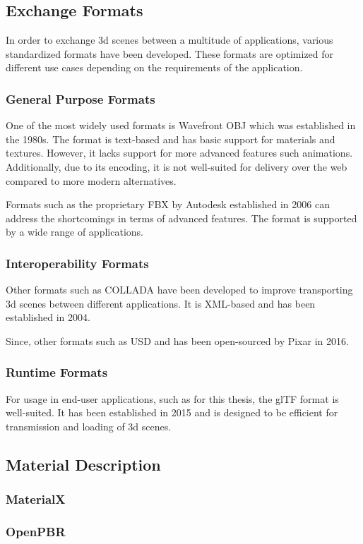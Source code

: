 \subsection{Exchange Formats}

In order to exchange 3d scenes between a multitude of applications, various standardized formats have been developed. These formats are optimized for different use cases depending on the requirements of the application.

\subsubsection{General Purpose Formats}

One of the most widely used formats is Wavefront OBJ which was established in the 1980s. The format is text-based and has basic support for materials and textures. However, it lacks support for more advanced features such animations. Additionally, due to its encoding, it is not well-suited for delivery over the web compared to more modern alternatives.

Formats such as the proprietary FBX by Autodesk established in 2006 can address the shortcomings in terms of advanced features. The format is supported by a wide range of applications.

\subsubsection{Interoperability Formats}

Other formats such as COLLADA have been developed to improve transporting 3d scenes between different applications. It is XML-based and has been established in 2004.

Since, other formats such as USD and has been open-sourced by Pixar in 2016.

\subsubsection{Runtime Formats}

For usage in end-user applications, such as for this thesis, the glTF format is well-suited. It has been established in 2015 and is designed to be efficient for transmission and loading of 3d scenes.

\subsection{Material Description}

\subsubsection{MaterialX}
\subsubsection{OpenPBR}
